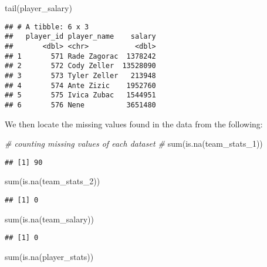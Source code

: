 \documentclass[
]{article}
\newenvironment{Shaded}{\begin{snugshade}}{\end{snugshade}}
\newcommand{\CommentTok}[1]{\textcolor[rgb]{0.56,0.35,0.01}{\textit{#1}}}
\newcommand{\FunctionTok}[1]{\textcolor[rgb]{0.00,0.00,0.00}{#1}}
\newcommand{\NormalTok}[1]{#1}
\begin{document}
\begin{Shaded}
\begin{Highlighting}[]
\FunctionTok{tail}\NormalTok{(player\_salary)}
\end{Highlighting}
\end{Shaded}

\begin{verbatim}
## # A tibble: 6 x 3
##   player_id player_name    salary
##       <dbl> <chr>           <dbl>
## 1       571 Rade Zagorac  1378242
## 2       572 Cody Zeller  13528090
## 3       573 Tyler Zeller   213948
## 4       574 Ante Zizic    1952760
## 5       575 Ivica Zubac   1544951
## 6       576 Nene          3651480
\end{verbatim}

We then locate the missing values found in the data from the following:

\begin{Shaded}
\begin{Highlighting}[]
\CommentTok{\# counting missing values of each dataset \#}
\FunctionTok{sum}\NormalTok{(}\FunctionTok{is.na}\NormalTok{(team\_stats\_1))}
\end{Highlighting}
\end{Shaded}

\begin{verbatim}
## [1] 90
\end{verbatim}

\begin{Shaded}
\begin{Highlighting}[]
\FunctionTok{sum}\NormalTok{(}\FunctionTok{is.na}\NormalTok{(team\_stats\_2))}
\end{Highlighting}
\end{Shaded}

\begin{verbatim}
## [1] 0
\end{verbatim}

\begin{Shaded}
\begin{Highlighting}[]
\FunctionTok{sum}\NormalTok{(}\FunctionTok{is.na}\NormalTok{(team\_salary))}
\end{Highlighting}
\end{Shaded}

\begin{verbatim}
## [1] 0
\end{verbatim}

\begin{Shaded}
\begin{Highlighting}[]
\FunctionTok{sum}\NormalTok{(}\FunctionTok{is.na}\NormalTok{(player\_stats))}
\end{Highlighting}
\end{Shaded}
\end{document}
